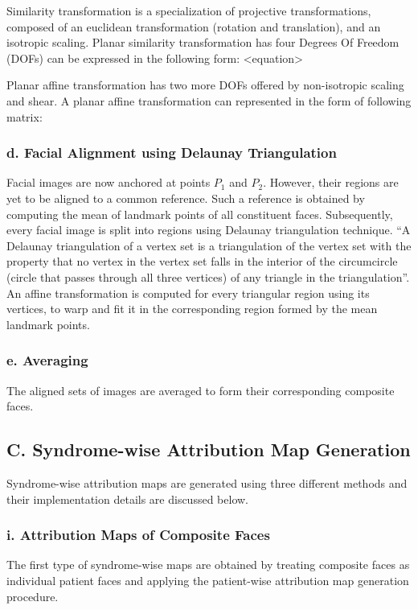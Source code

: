 \documentclass[../report.tex]{subfiles}
\begin{document}
    Similarity transformation \cite{hartley2003multiple} is a specialization of projective transformations, composed of an euclidean transformation (rotation and translation), and an isotropic scaling. Planar similarity transformation has four Degrees Of Freedom (DOFs) can be expressed in the following form:
    <equation>
    
    Planar affine transformation has two more DOFs offered by non-isotropic scaling and shear. A planar affine transformation can represented in the form of following matrix:
    
    \subsubsection{d. Facial Alignment using Delaunay Triangulation}
    Facial images are now anchored at points $P_{1}$ and $P_{2}$. However, their regions are yet to be aligned to a common reference. Such a reference is obtained by computing the mean of landmark points of all constituent faces. Subsequently, every facial image is split into regions using Delaunay triangulation technique. \enquote{A Delaunay triangulation of a vertex set is a triangulation of the vertex set with the property that no vertex in the vertex set falls in the interior of the circumcircle (circle that passes through all three vertices) of any triangle in the triangulation}\cite{cmu_triangle:_nodate}. An affine transformation is computed for every triangular region using its vertices, to warp and fit it in the corresponding region formed by the mean landmark points.
    
    \subsubsection{e. Averaging}
    The aligned sets of images are averaged to form their corresponding composite faces.
    
    \subsection{C. Syndrome-wise Attribution Map Generation}
    Syndrome-wise attribution maps are generated using three different methods and their implementation details are discussed below.
    \subsubsection{i. Attribution Maps of Composite Faces}
    The first type of syndrome-wise maps are obtained by treating composite faces as individual patient faces and applying the patient-wise attribution map generation procedure.
\end{document}
